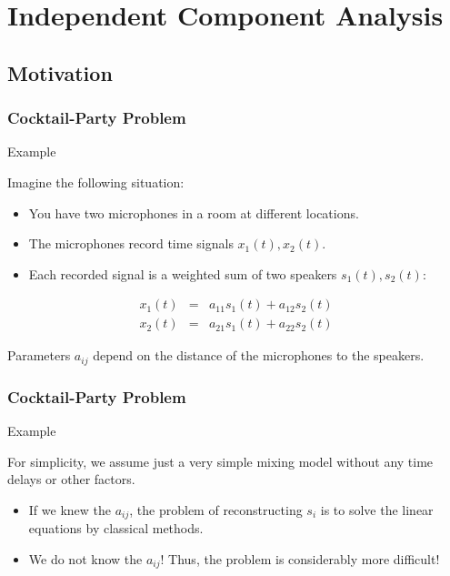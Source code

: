\def\kurt{\mathop{\mathsf{kurt}}}
\def\MI{\mathop{\mathsf{MI}}}
\def\KL{\mathop{\mathsf{D}_{\mathsf{KL}}}}

\section{Independent Component Analysis}

\subsection{Motivation}

\begin{frame}
  \frametitle{Cocktail-Party Problem}

  \begin{ovalblock}{Example}
  
  Imagine the following situation:

    \begin{itemize}
      \item You have two microphones in a room at different locations.
      \item The microphones record time signals $x_1(t), x_2(t)$. \pause
      \item Each recorded signal is a weighted sum of two speakers $s_1(t), s_2(t)$: \pause 
    \end{itemize}
%
    \begin{eqnarray*}
      x_1(t) &=& a_{11} s_1(t) + a_{12} s_2(t) \\
      x_2(t) &=& a_{21} s_1(t) + a_{22} s_2(t)
    \end{eqnarray*}

    Parameters $a_{ij}$ depend on the distance of the microphones to the speakers.
  \end{ovalblock}
\end{frame}


\begin{frame}
  \frametitle{Cocktail-Party Problem}

  \begin{ovalblock}{Example}
  
  For simplicity, we assume just a very simple mixing model without any time delays or other factors. \\[.5cm]
    \pause


    \begin{itemize}
      \item If we knew the $a_{ij}$, the problem of reconstructing $s_i$ is to solve the linear equations by classical methods. \pause 
      \item {} We do not know the $a_{ij}$! Thus, the problem is considerably more difficult!
    \end{itemize}
  \end{ovalblock}
\end{frame}


